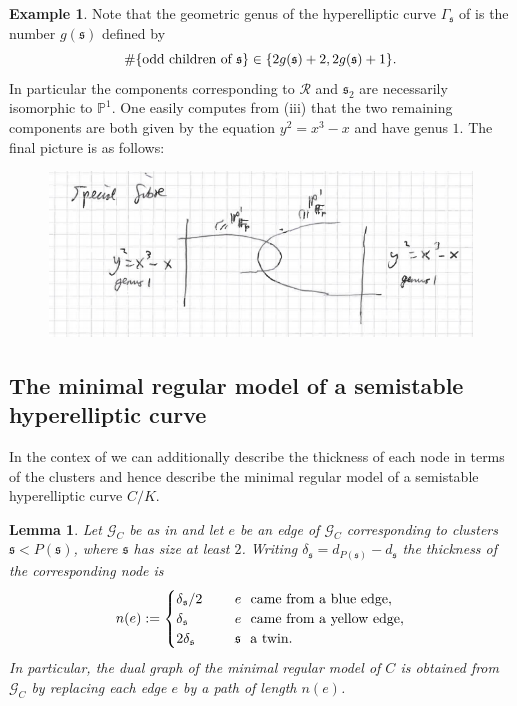 \documentclass[12pt]{amsart}
\numberwithin{equation}{section}
\newtheorem{lemma}[equation]{Lemma}
\theoremstyle{remark}
\theoremstyle{definition}
\newtheorem{example}[equation]{Example}
\theoremstyle{definition}
\theoremstyle{definition}
\theoremstyle{definition}
\theoremstyle{definition}
\theoremstyle{definition}
\begin{document}
\begin{example}
Note that the geometric genus of the hyperelliptic curve $\Gamma_\mathfrak{s}$ of  is the number $g(\mathfrak{s})$ defined by
\[\#\{\textup{odd children of }\mathfrak{s}\}\in \{2g(\mathfrak{s})+2,2g(\mathfrak{s})+1\}.\]
In particular the components corresponding to $\mathcal{R}$ and $\mathfrak{s}_2$ are necessarily isomorphic to $\mathbb{P}^1$. One easily computes from   (iii) that the two remaining components are both given by the equation $y^2=x^3-x$ and have genus $1$. The final picture is as follows: 
\begin{figure} [!htb] 
\includegraphics[angle=0,scale=0.6]{special_fibre_ex}
\end{figure}
\end{example}




\subsection{The minimal regular model of a semistable hyperelliptic curve}

In the contex of  we can additionally describe the thickness of each node in terms of the clusters and hence describe the minimal regular model of a semistable hyperelliptic curve $C/K$.

\begin{lemma}
Let $\mathcal{G}_C$ be as in   and let $e$ be an edge of $\mathcal{G}_C$ corresponding to clusters $\mathfrak{s}<P(\mathfrak{s})$, where $\mathfrak{s}$ has size at least $2$. Writing $\delta_\mathfrak{s}=d_{P(\mathfrak{s})}-d_\mathfrak{s}$  the thickness of the corresponding node is 
\[n(e):=\begin{cases} \delta_{\mathfrak{s}}/2~~&~~e~~\textup{came from a blue edge},\\
 \delta_\mathfrak{s}~~&~~e~~\textup{came from a yellow edge},\\
 2\delta_\mathfrak{s}~~&~~\mathfrak{s}~~\textup{a twin.}
\end{cases}\]
In particular, the dual graph of the minimal regular model of $C$ is obtained from $\mathcal{G}_C$ by replacing each edge $e$ by a path of length $n(e)$.
\end{lemma}
\end{document}
